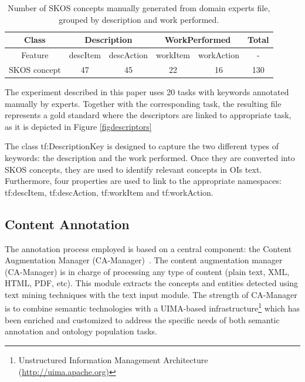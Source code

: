 \documentclass[a4paper,english,submission]{rnti}  %
\begin{document}
\begin{table}[h!tb]
\caption{Number of SKOS concepts manually generated from domain experts file, grouped by description and work performed.}
\label{tabskos}
\centering
\begin{tabular}{|c|c|c|c|c|c|}
\hline 
Class & \multicolumn{2}{c|}{Description} & \multicolumn{2}{c|}{WorkPerformed} & Total  \\ 
\hline 
Feature & descItem & descAction & workItem & workAction & - \\ 
\hline 
SKOS concept & 47 & 45 & 22 & 16 & 130 \\ 
\hline 

\end{tabular} 

\end{table}



The experiment described in this paper uses 20 tasks with keywords annotated manually by experts. Together with the corresponding task, the resulting file represents a gold standard where the descriptors are linked to appropriate task, as it is depicted in Figure \ref{figdescriptors}


The class \textsf{tf:DescriptionKey} is designed to capture the two different types of keywords: the description and the work performed. Once they are converted into SKOS concepts, they are used to identify relevant concepts in OIs text. Furthermore, four properties are used to link to the appropriate namespaces: \textsf{tf:descItem}, \textsf{tf:descAction}, \textsf{tf:workItem} and \textsf{tf:workAction}.


\subsection{Content Annotation}
\label{sec:contentannot}

The annotation process employed is based on a central component: the Content Augmentation Manager (CA-Manager)~\cite{cam2013}. The content augmentation manager (CA-Manager) is in charge of processing any type of content (plain text, XML, HTML, PDF, etc). This module extracts the concepts and entities detected using text mining techniques with the text input module. The strength of CA-Manager is to combine semantic technologies with a UIMA-based infrastructure\footnote{Unstructured Information Management Architecture (\url{http://uima.apache.org)}} which has been enriched and customized to address the specific needs of both semantic annotation and ontology population tasks.
\end{document}
